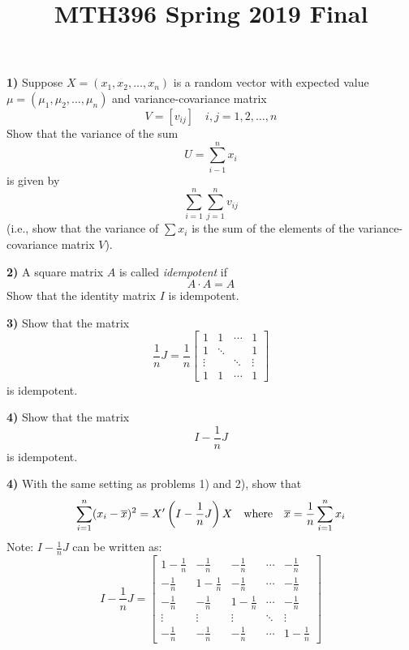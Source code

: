 \documentclass{amsart}
\begin{document}
\title{MTH396 Spring 2019 Final}
\maketitle
\par\vspace{0.4 cm}\noindent
\textbf{1)}  Suppose $X=(x_1,x_2,\ldots,x_n)$ is a random vector with expected value $\mu=(\mu_1,\mu_2,\ldots,\mu_n)$ and variance-covariance matrix 
\[
V = \left[v_{ij}\right]\quad i,j=1,2,\ldots,n
\]
Show that the variance of the sum
\[
U = \sum_{i-1}^nx_i
\]
is given by
\[
\sum_{i=1}^n\sum_{j=1}^nv_{ij}
\]
(i.e., show that the variance of $\sum x_i$ is the sum of the elements of the variance-covariance matrix $V$).
\par\vspace{1 cm}\noindent
\textbf{2)}  A square matrix $A$ is called \textit{idempotent} if
\[
A\cdot A = A
\]
Show that the identity matrix $I$ is idempotent.
\par\vspace{1 cm}\noindent
\textbf{3)}  Show that the matrix
\[
\frac{1}{n}J = \frac{1}{n}\left[\begin{array}{cccc}1&1&\cdots&1\\1&\ddots&&1\\\vdots&&\ddots&\vdots\\1&1&\cdots&1\end{array}\right]
\]
is idempotent.
\par\vspace{1 cm}\noindent
\textbf{4)}  Show that the matrix 
\[
I-\frac{1}{n}J
\]
is idempotent.
\par\vspace{1 cm}\noindent
\textbf{4)}  With the same setting as problems 1) and 2), show that
\[
\sum_{i=1}^n(x_i-\overline{x})^2 = X'\left(I-\frac{1}{n}J\right)X\quad\mbox{where}\quad \overline{x}=\frac{1}{n}\sum_{i=1}^n x_i
\vspace{0.5 cm}
\]
Note: $I-\frac{1}{n}J$ can be written as:
\[
I-\frac{1}{n}J = \left[\begin{array}{rrrrr}
1-\frac{1}{n} &-\frac{1}{n}  &-\frac{1}{n}  &\cdots &-\frac{1}{n}\\
-\frac{1}{n}  &1-\frac{1}{n} &-\frac{1}{n}  &\cdots &-\frac{1}{n}\\
-\frac{1}{n}  &-\frac{1}{n}  &1-\frac{1}{n} &\cdots &-\frac{1}{n}\\
\vdots        &\vdots        &\vdots        &\ddots &\vdots\\
-\frac{1}{n}&-\frac{1}{n}&-\frac{1}{n} &\cdots&1-\frac{1}{n}
\end{array}\right]
\]
\end{document}
